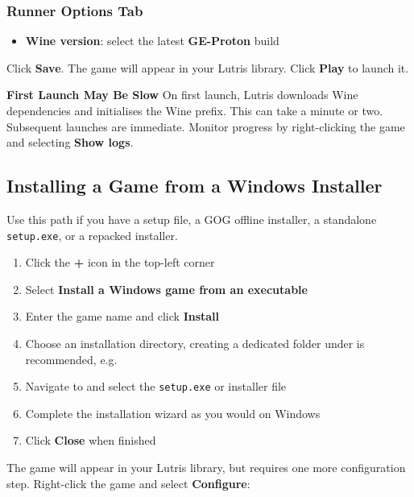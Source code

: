 \documentclass{article}
\newcommand{\code}[1]{\colorbox{codebg}{\texttt{#1}}}
\begin{document}
\subsubsection{Runner Options Tab}

\begin{itemize}[leftmargin=1.5em, nosep, label={\tiny\textbullet}]
	\item \textbf{Wine version}: select the latest \textbf{GE-Proton} build
\end{itemize}

\noindent Click \textbf{Save}. The game will appear in your Lutris library.
Click \textbf{Play} to launch it.

\begin{callout}{\textbf{First Launch May Be Slow}}
	On first launch, Lutris downloads Wine dependencies and initialises the Wine
	prefix. This can take a minute or two. Subsequent launches are immediate.
	Monitor progress by right-clicking the game and selecting \textbf{Show logs}.
\end{callout}

\subsection{Installing a Game from a Windows Installer}

Use this path if you have a setup file, a GOG offline installer, a standalone
\code{setup.exe}, or a repacked installer.

\begin{enumerate}[leftmargin=1.5em, nosep, label={\arabic*.}]
	\item Click the \textbf{+} icon in the top-left corner
	\item Select \textbf{Install a Windows game from an executable}
	\item Enter the game name and click \textbf{Install}
	\item Choose an installation directory, creating a dedicated folder under
	 is recommended, e.g.\ 
	\item Navigate to and select the \code{setup.exe} or installer file
	\item Complete the installation wizard as you would on Windows
	\item Click \textbf{Close} when finished
\end{enumerate}

\noindent The game will appear in your Lutris library, but requires one more
configuration step. Right-click the game and select \textbf{Configure}:
\end{document}
